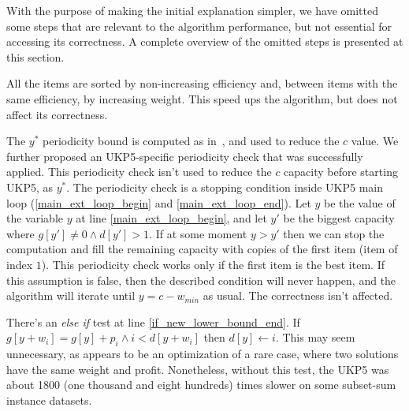 \documentclass[runningheads,a4paper]{llncs}
\begin{document}
With the purpose of making the initial explanation simpler, we have omitted some steps that are relevant to the algorithm performance, but not essential for accessing its correctness. 
A complete overview of the omitted steps is presented at this section.

All the items are sorted by non-increasing efficiency and, between items with the same efficiency, by increasing weight. 
This speed ups the algorithm, but does not affect its correctness.

The \(y^{*}\) periodicity bound is computed as in~\cite[p. 223]{gar72}, and used to reduce the \(c\) value. 
We further proposed an UKP5-specific periodicity check that was successfully applied. 
This periodicity check isn't used to reduce the \(c\) capacity before starting UKP5, as \(y^{*}\). 
The periodicity check is a stopping condition inside UKP5 main loop (\ref{main_ext_loop_begin} and \ref{main_ext_loop_end}). 
Let \(y\) be the value of the variable \(y\) at line \ref{main_ext_loop_begin}, and let \(y'\) be the biggest capacity where \(g[y'] \neq 0 \land d[y'] > 1\). 
If at some moment \(y > y'\) then we can stop the computation and fill the remaining capacity with copies of the first item (item of index \(1\)).
This periodicity check works only if the first item is the best item. 
If this assumption is false, then the described condition will never happen, and the algorithm will iterate until \(y = c - w_{min}\) as usual. The correctness isn't affected.

There's an \emph{else if} test at line \ref{if_new_lower_bound_end}. 
If \(g[y + w_i] = g[y] + p_i \land i < d[y + w_i]\) then \(d[y] \gets i\). 
This may seem unnecessary, as appears to be an optimization of a rare case, where two solutions have the same weight and profit. 
Nonetheless, without this test, the UKP5 was about 1800 (one thousand and eight hundreds) times slower on some subset-sum instance datasets.
\end{document}
